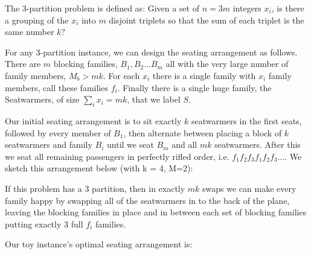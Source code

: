 The 3-partition problem is defined as: Given a set of $n = 3m$ integers $x_i$, is there a grouping of the $x_i$ into $m$ disjoint triplets so that the sum of each triplet is the same number $k$?

For any 3-partition instance, we can design the seating arrangement as follows.  There are $m$ blocking families, $B_1, B_2... B_m$ all with the very large number of family members, $M_b > mk$.  For each $x_i$ there is a single family with $x_i$ family members, call these families $f_i$.  Finally there is a single huge family, the Seatwarmers, of size $\sum_i x_i = mk$, that we label $S$.

Our initial seating arrangement is to sit exactly $k$ seatwarmers in the first seats, followed by every member of $B_1$, then alternate between placing a block of $k$ seatwarmers and family $B_i$ until we seat $B_m$ and all $mk$ seatwarmers.  After this we seat all remaining passengers in perfectly rifled order, i.e. $f_1 f_2 f_3 f_1 f_2 f_3 \hdots$.  We sketch this arrangement below (with k = 4, M=2):

\begin{figure}[H]
\centering
{}
\end{figure}
\FloatBarrier

If this problem has a 3 partition, then in exactly $mk$ swaps we can make every family happy by swapping all of the seatwarmers in to the back of the plane, leaving the blocking families in place and in between each set of blocking families putting exactly 3 full $f_i$ families.  

Our toy instance's optimal seating arrangement is:

\begin{figure}[H]
\centering
{}
\end{figure}

